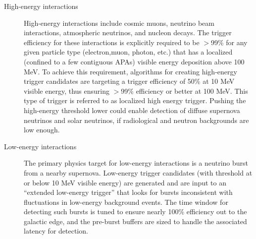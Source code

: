 \begin{description}
\item[High-energy interactions] High-energy interactions include cosmic muons, neutrino beam interactions, atmospheric neutrinos, and nucleon decays. 
  The trigger efficiency for these interactions is explicitly required to be $>$99\% for any given particle type (electron,muon, photon, etc.) that has a localized (confined to a few contiguous APAs) visible energy deposition above 100 MeV.
  To achieve this requirement, algorithms for creating high-energy trigger candidates are targeting a trigger efficiency of 50\% at 10 MeV visible energy, thus ensuring $>$99\% efficiency or better at 100 MeV.
  This type of trigger is referred to as localized high energy trigger. 
  Pushing the high-energy threshold lower could enable detection of diffuse supernova neutrinos and solar neutrinos, if radiological and neutron backgrounds are low enough.

\item[Low-energy interactions] The primary physics target for
  low-energy interactions is a neutrino burst from a nearby supernova. 
  Low-energy trigger candidates (with threshold at or below 10 MeV visible energy) are generated and are input to an ``extended low-energy trigger'' that looks for bursts inconsistent with fluctuations in low-energy background events. 
  The time window for detecting such bursts is tuned to ensure
  nearly 100\% efficiency out to the galactic edge, and the pre-burst
  buffers are sized to handle the associated latency for detection.

\end{description}



